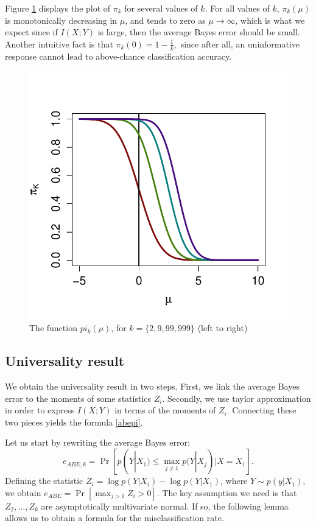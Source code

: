 \documentclass{article}
\begin{document}
Figure \ref{fig:pi} displays the plot of $\pi_k$ for several values of $k$.
For all values of $k$, $\pi_k(\mu)$ is monotonically decreasing in $\mu$, and tends to zero as $\mu \to \infty$, which is what we expect since if $I(X; Y)$ is large, then the average Bayes error should be small.
Another intuitive fact is that 
$
\pi_k(0) = 1 - \frac{1}{k},
$ since after all, an uninformative response cannot lead to above-chance classification accuracy.

\begin{figure}
\centering
\includegraphics[scale = 0.5, clip=true, trim=0 0.2in 0 0.5in]{../info_theory_sims/illus_piK.pdf}
\caption{The function $pi_k(\mu)$, for $k = \{2, 9, 99, 999\}$ (left to right) \label{fig:pi}}
\end{figure}

\subsection{Universality result}

We obtain the universality result in two steps.  First, we link the average Bayes error to the moments of
some statistics $Z_i$.  Secondly, we use taylor approximation in order to express $I(X; Y)$ in terms of the moments of $Z_i$.  Connecting these two pieces yields the formula \eqref{abepi}.

Let us start by rewriting the average Bayes error:
\[
e_{ABE, k} = \Pr[p(Y|X_1) \leq \max_{j \neq 1} p(Y|X_j)| X = X_1].
\]
Defining the statistic $Z_i = \log p(Y|X_i) - \log p(Y|X_1)$, where $Y \sim p(y|X_1)$, we obtain $
e_{ABE} = \Pr[\max_{j > 1} Z_i > 0].
$
The key assumption we need is that $Z_2,\hdots, Z_k$ are asymptotically multivariate normal.
If so, the following lemma
allows us to obtain a formula for the misclassification rate.
\end{document}
